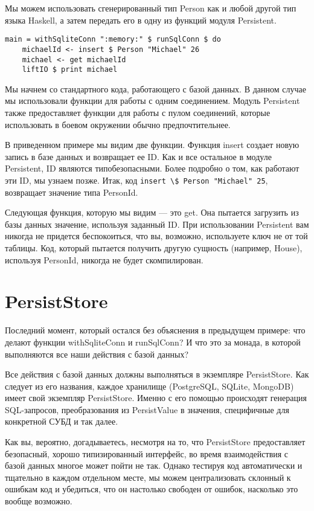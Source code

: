 Мы можем использовать сгенерированный тип Person как и любой другой тип языка Haskell, а затем передать его в одну из функций модуля Persistent.

\begin{lstlisting}
main = withSqliteConn ":memory:" $ runSqlConn $ do
    michaelId <- insert $ Person "Michael" 26
    michael <- get michaelId
    liftIO $ print michael
\end{lstlisting}%

Мы начнем со стандартного кода, работающего с базой данных. В данном случае мы использовали функции для работы с одним соединением. Модуль Persistent также предоставляет функции для работы с пулом соединений, которые использовать в боевом окружении обычно предпочтительнее.

В приведенном примере мы видим две функции. Функция insert создает новую запись в базе данных и возвращает ее ID. Как и все остальное в модуле Persistent, ID являются типобезопасными. Более подробно о том, как работают эти ID, мы узнаем позже. Итак, код \lstinline'insert \$ Person "Michael" 25', возвращает значение типа PersonId.

Следующая функция, которую мы видим --- это get. Она пытается загрузить из базы данных значение, используя заданный ID. При использовании Persistent вам никогда не придется беспокоиться, что вы, возможно, используете ключ не от той таблицы. Код, который пытается получить другую сущность (например, House), используя PersonId, никогда не будет скомпилирован.

\section{PersistStore}

Последний момент, который остался без объяснения в предыдущем примере: что делают функции withSqliteConn и runSqlConn? И что это за монада, в которой выполняются все наши действия с базой данных?

Все действия с базой данных должны выполняться в экземпляре PersistStore. Как следует из его названия, каждое хранилище (PostgreSQL, SQLite, MongoDB) имеет свой экземпляр PersistStore. Именно с его помощью происходят генерация SQL-запросов, преобразования из PersistValue в значения, специфичные для конкретной СУБД и так далее.

\begin{remark}
Как вы, вероятно, догадываетесь, несмотря на то, что PersistStore предоставляет безопасный, хорошо типизированный интерфейс, во время взаимодействия с базой данных многое может пойти не так. Однако тестируя код автоматически и тщательно в каждом отдельном месте, мы можем централизовать склонный к ошибкам код и убедиться, что он настолько свободен от ошибок, насколько это вообще возможно.
\end{remark}

